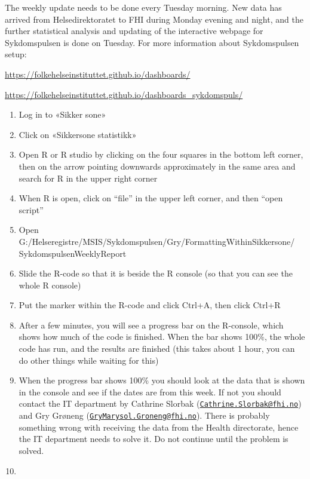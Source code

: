 \documentclass[12pt,]{article}
\providecommand{\tightlist}{%
  \setlength{\itemsep}{0pt}\setlength{\parskip}{0pt}}
\theoremstyle{definition}
\theoremstyle{definition}
\theoremstyle{definition}
\theoremstyle{remark}
\begin{document}
The weekly update needs to be done every Tuesday morning. New data has
arrived from Helsedirektoratet to FHI during Monday evening and night,
and the further statistical analysis and updating of the interactive
webpage for Sykdomspulsen is done on Tuesday. For more information about
Sykdomspulsen setup:

\url{https://folkehelseinstituttet.github.io/dashboards/}

\url{https://folkehelseinstituttet.github.io/dashboards_sykdomspuls/}

\begin{enumerate}
\def\labelenumi{\arabic{enumi}.}
\tightlist
\item
  Log in to «Sikker sone»
\item
  Click on «Sikkersone statistikk»
\item
  Open R or R studio by clicking on the four squares in the bottom left
  corner, then on the arrow pointing downwards approximately in the same
  area and search for R in the upper right corner
\item
  When R is open, click on ``file'' in the upper left corner, and then
  ``open script''
\item
  Open
  G:/Helseregistre/MSIS/Sykdomspulsen/Gry/FormattingWithinSikkersone/\\
  SykdomspulsenWeeklyReport
\item
  Slide the R-code so that it is beside the R console (so that you can
  see the whole R console)
\item
  Put the marker within the R-code and click Ctrl+A, then click Ctrl+R
\item
  After a few minutes, you will see a progress bar on the R-console,
  which shows how much of the code is finished. When the bar shows
  100\%, the whole code has run, and the results are finished (this
  takes about 1 hour, you can do other things while waiting for this)
\item
  When the progress bar shows 100\% you should look at the data that is
  shown in the console and see if the dates are from this week. If not
  you should contact the IT department by Cathrine Slorbak
  (\href{mailto:Cathrine.Slorbak@fhi.no}{\nolinkurl{Cathrine.Slorbak@fhi.no}})
  and Gry Grøneng
  (\href{mailto:GryMarysol.Groneng@fhi.no}{\nolinkurl{GryMarysol.Groneng@fhi.no}}).
  There is probably something wrong with receiving the data from the
  Health directorate, hence the IT department needs to solve it. Do not
  continue until the problem is solved.
\item

\end{enumerate}
\end{document}
